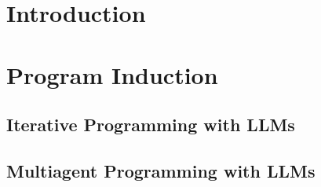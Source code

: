 \usepackage{lipsum}




\coverpage{\TITLE}{\SUBTITLE}{\AUTHOR}{\DATE}{\SUBJECT}

\newpage



\tableofcontents

\listoffigures

\listoftables


\printnomenclature

\part{Introduction}

\newpage


\newpage


\newpage


\part{Program Induction}

\newpage


\newpage


\newpage


\newpage


\newpage
\chapter{Iterative Programming with LLMs}

\newpage
\chapter{Multiagent Programming with LLMs}
%

